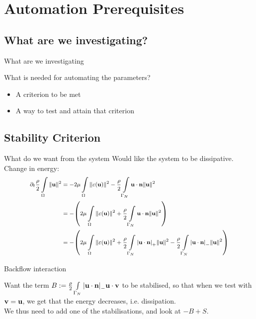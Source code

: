 \section{Automation Prerequisites}

 \subsection{What are we investigating?}
    \begin{frame} {What are we investigating}
        
        \begin{block}{What is needed for automating the parameters?}
        \begin{itemize}
            \item A criterion to be met
            \item A way to test and attain that criterion
        \end{itemize}
        \end{block}
    \end{frame}
  
    \subsection{Stability Criterion}
    \begin{frame}{What do we want from the system}
        Would like the system to be dissipative.\\
        Change in energy:
        \[\footnotesize
\begin{aligned}
   \partial_t\frac{\rho}{2}\int\limits_{\Omega}\norm{{\textbf{u}}}^2 &= -2\mu\int\limits_{\Omega}\norm{\varepsilon({\textbf{u}})}^2 - \frac{\rho}{2}\int\limits_{\Gamma_{N}}{\textbf{u}}\cdot{\textbf{n}}\norm{{\textbf{u}}}^2\\
                                              &= -\qty(2\mu\int\limits_{\Omega}\norm{\varepsilon({\textbf{u}})}^2 + \frac{\rho}{2}\int\limits_{\Gamma_{N}}{\textbf{u}}\cdot{\textbf{n}}\norm{{\textbf{u}}}^2)\\
                                              &= -\qty(2\mu\int\limits_{\Omega}\norm{\varepsilon({\textbf{u}})}^2 + \frac{\rho}{2}\int\limits_{\Gamma_{N}}\abs{{\textbf{u}}\cdot{\textbf{n}}}_+\norm{{\textbf{u}}}^2 - \frac{\rho}{2}\int\limits_{\Gamma_{N}}\abs{{\textbf{u}}\cdot{\textbf{n}}}_-\norm{{\textbf{u}}}^2)
\end{aligned}
\]
    \end{frame}
    
    \begin{frame}{Backflow interaction}

Want the term \(B := \frac{\rho}{2}\int\limits_{\Gamma_{N}}\abs{{\textbf{u}}\cdot{\textbf{n}}}_- {\textbf{u}} \cdot {\textbf{v}}\) to be stabilised, so that when we test with \({\textbf{v}} = {\textbf{u}}\), we get that the energy decreases, i.e. dissipation.\\
We thus need to add one of the stabilisations, and look at \(-B+S\).
    \end{frame}
    
